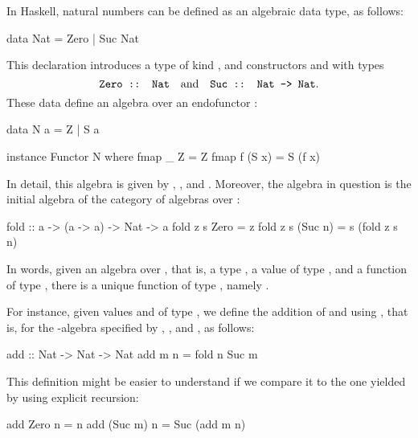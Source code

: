 \begin{example}

  \label{ex:algebra-natural-numbers-haskell}


  In Haskell, natural numbers can be defined as an algebraic data
  type, as follows:
  \begin{codehaskell}
data Nat = Zero | Suc Nat
  \end{codehaskell}
  This declaration introduces a type  of kind
  \texthaskell{*}, and constructors  and
   with types
  \begin{equation*}
    \text{\texttt{Zero :: Nat}}
    \quad
    \text{and}
    \quad
    \text{\texttt{Suc :: Nat -> Nat}}
    \text{.}
  \end{equation*}
  These data define an algebra over an endofunctor :
  \begin{codehaskell}
data N a = Z | S a

instance Functor N where
  fmap _ Z     = Z
  fmap f (S x) = S (f x)
\end{codehaskell}
  In detail, this algebra is given by ,
  , and . Moreover, the algebra in
  question is the initial algebra of the category of algebras over
  :
  \begin{codehaskell}
fold :: a -> (a -> a) -> Nat -> a
fold z s Zero    = z
fold z s (Suc n) = s (fold z s n)
  \end{codehaskell}
  In words, given an algebra over , that is, a type
  , a value  of type ,
  and a function  of type , there
  is a unique function of type , namely
  .

  For instance, given values  and  of
  type , we define the addition of 
  and  using , that is,
   for the -algebra specified by
  , , and , as
  follows:
  \begin{codehaskell}
add :: Nat -> Nat -> Nat
add m n = fold n Suc m
  \end{codehaskell}
  This definition might be easier to understand if we compare it to
  the one yielded by using explicit recursion:
  \begin{codehaskell}
add Zero    n = n
add (Suc m) n = Suc (add m n)
  \end{codehaskell}


\end{example}
